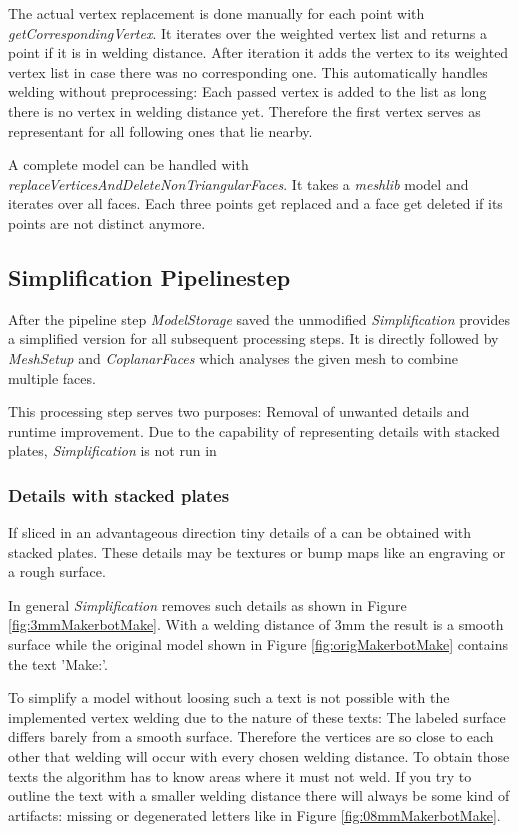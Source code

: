 \documentclass[../ClassicThesis.tex]{subfiles}
\begin{document}
The actual vertex replacement is done manually for each point with \emph{getCorrespondingVertex}. It iterates over the weighted vertex list and returns a point if it is in welding distance. After iteration it adds the vertex to its weighted vertex list in case there was no corresponding one. This automatically handles welding without preprocessing: Each passed vertex is added to the list as long there is no vertex in welding distance yet. Therefore the first vertex serves as representant for all following ones that lie nearby.

A complete model can be handled with \emph{replaceVerticesAndDeleteNonTriangularFaces}. It takes a \emph{meshlib} model and iterates over all faces. Each three points get replaced and a face get deleted if its points are not distinct anymore. 




\subsection{Simplification Pipelinestep}

After the pipeline step \emph{ModelStorage} saved the unmodified {\threedmodel} \emph{Simplification} provides a simplified version for all subsequent processing steps. It is directly followed by \emph{MeshSetup} and \emph{CoplanarFaces} which analyses the given mesh to combine multiple faces. 

This processing step serves two purposes: Removal of unwanted details and runtime improvement. Due to the capability of representing details with stacked plates, \emph{Simplification} is not run in 

\subsubsection{Details with stacked plates}

If sliced in an advantageous direction tiny details of a {\threedmodel} can be obtained with stacked plates. These details may be textures or bump maps like an engraving or a rough surface.

In general \emph{Simplification} removes such details as shown in Figure \ref{fig:3mmMakerbotMake}. With a welding distance of 3mm the result is a smooth surface while the original model shown in Figure \ref{fig:origMakerbotMake} contains the text 'Make:'.

To simplify a model without loosing such a text is not possible with the implemented vertex welding due to the nature of these texts: The labeled surface differs barely from a smooth surface. Therefore the vertices are so close to each other that welding will occur with every chosen welding distance. To obtain those texts the algorithm has to know areas where it must not weld. If you try to outline the text with a smaller welding distance there will always be some kind of artifacts: missing or degenerated letters like in Figure \ref{fig:08mmMakerbotMake}.
\end{document}
